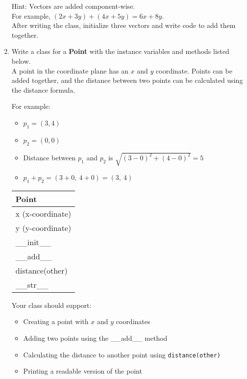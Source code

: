 \documentclass{article}
\begin{document}
\begin{enumerate}
		Hint: Vectors are added component-wise.\\
		For example, $(2x + 3y) + (4x + 5y) = 6x + 8y$.\\[0.5em]
		After writing the class, initialize three vectors and write code to add them together.




	\item
		Write a class for a \textbf{Point} with the instance variables and methods listed below.\\
		A point in the coordinate plane has an $x$ and $y$ coordinate. Points can be added together, 
		and the distance between two points can be calculated using the distance formula.
			
		\begin{minipage}[t]{0.65\textwidth}
			For example:
			\begin{itemize}
				\item $p_1 = (3, 4)$
				\item $p_2 = (0, 0)$
				\item Distance between $p_1$ and $p_2$ is $\sqrt{(3 - 0)^2 + (4 - 0)^2} = 5$
				\item $p_1 + p_2 = (3 + 0,\ 4 + 0) = (3,\ 4)$
			\end{itemize}
		\end{minipage}
		\hfill
		\begin{minipage}[t]{0.32\textwidth}
			\vspace{.2em}
			\begin{flushright}
				\begin{tabular}{|l|}
					\hline
					Point \\ \hline
					x (x-coordinate) \\
					y (y-coordinate) \\ \hline
					\_\_init\_\_ \\
					\_\_add\_\_ \\
					distance(other) \\
					\_\_str\_\_ \\ \hline
				\end{tabular}
			\end{flushright}
		\end{minipage}
		
		Your class should support:
		\begin{itemize}
			\item Creating a point with $x$ and $y$ coordinates
			\item Adding two points using the \_\_add\_\_ method
			\item Calculating the distance to another point using \texttt{distance(other)}
			\item Printing a readable version of the point
		\end{itemize}
		

\end{enumerate}
\end{document}
